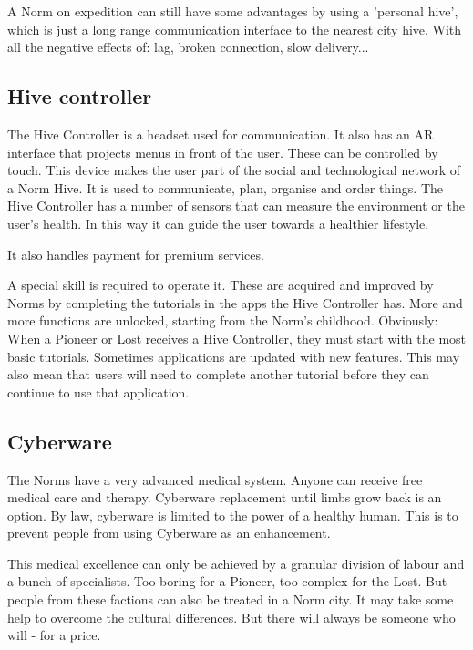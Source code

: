 A Norm on expedition can still have some advantages by using a 'personal hive', which is just a long range communication interface to the nearest city hive. With all the negative effects of: lag, broken connection, slow delivery...

\subsection{Hive controller}
\label{sec:Hive controller}

The Hive Controller is a headset used for communication. It also has an AR interface that projects menus in front of the user. These can be controlled by touch. This device makes the user part of the social and technological network of a Norm Hive.
It is used to communicate, plan, organise and order things.
The Hive Controller has a number of sensors that can measure the environment or the user's health. In this way it can guide the user towards a healthier lifestyle.

It also handles payment for premium services.

A special skill is required to operate it. These are acquired and improved by Norms by completing the tutorials in the apps the Hive Controller has. More and more functions are unlocked, starting from the Norm's childhood. Obviously: When a Pioneer or Lost receives a Hive Controller, they must start with the most basic tutorials.
Sometimes applications are updated with new features. This may also mean that users will need to complete another tutorial before they can continue to use that application.

\subsection{Cyberware}
\label{sec:Cyberware Norm}

The Norms have a very advanced medical system. Anyone can receive free medical care and therapy. Cyberware replacement until limbs grow back is an option.
By law, cyberware is limited to the power of a healthy human. This is to prevent people from using Cyberware as an enhancement.

This medical excellence can only be achieved by a granular division of labour and a bunch of specialists.
Too boring for a Pioneer, too complex for the Lost. But people from these factions can also be treated in a Norm city. It may take some help to overcome the cultural differences. But there will always be someone who will - for a price.

